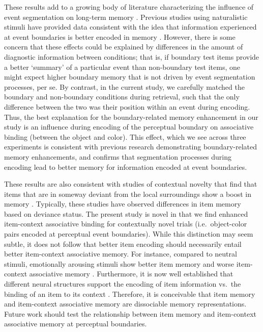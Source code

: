 These results add to a growing body of literature characterizing the
influence of event segmentation on long-term memory
\autocites{boltz_temporal_1992}{dubrow_influence_2013}{ezzyat_what_2011}{ezzyat_similarity_2014}{newtson_perceptual_1976}{schwan_cognitive_2004}{zacks_event_2006}.
Previous studies using naturalistic stimuli have provided data
consistent with the idea that information experienced at event
boundaries is better encoded in memory
\autocites{boltz_temporal_1992}{newtson_perceptual_1976}{schwan_cognitive_2004}.
However, there is some concern that these effects could be explained by
differences in the amount of diagnostic information between conditions;
that is, if boundary test items provide a better `summary' of a
particular event than non-boundary test items, one might expect higher
boundary memory that is not driven by event segmentation processes, per
se. By contrast, in the current study, we carefully matched the boundary
and non-boundary conditions during retrieval, such that the only
difference between the two was their position within an event during
encoding. Thus, the best explanation for the boundary-related memory
enhancement in our study is an influence during encoding of the
perceptual boundary on associative binding (between the object and
color). This effect, which we see across three experiments is consistent
with previous research demonstrating boundary-related memory
enhancements, and confirms that segmentation processes during encoding
lead to better memory for information encoded at event boundaries.

These results are also consistent with studies of contextual novelty
that find that items that are in someway deviant from the local
surroundings show a boost in memory
\autocites{cimbalo_making_1978}{lin_enhanced_2010}{restorff_uber_1933}{swallow_role_2011}{swallow_attentional_2013}{wallace_review_1965}.
Typically, these studies have observed differences in item memory based
on deviance status. The present study is novel in that we find enhanced
item-context associative binding for contextually novel trials
(i.e.~object-color pairs encoded at perceptual event boundaries). While
this distinction may seem subtle, it does not follow that better item
encoding should necessarily entail better item-context associative
memory. For instance, compared to neutral stimuli, emotionally arousing
stimuli show better item memory and worse item-context associative
memory \autocites{bisby_negative_2014}{madan_emotional_2012}.
Furthermore, it is now well established that different neural structures
support the encoding of item information vs.~the binding of an item to
its context
\autocites{davachi_item_2006}{davachi_multiple_2003}{ranganath_dissociable_2004}.
Therefore, it is conceivable that item memory and item-context
associative memory are dissociable memory representations. Future work
should test the relationship between item memory and item-context
associative memory at perceptual boundaries.

